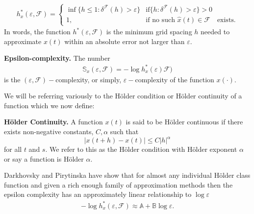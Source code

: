   \begin{align*}
    h_x^*(\varepsilon, \mathcal{F}) = \begin{cases}
      \inf \{ h \leq 1 : \delta^{\mathcal{F}}(h) > \varepsilon \} & \text{if} 
      \{ h : \delta^{\mathcal{F}}(h) > \varepsilon \} > 0  \\ 
        1, &  \text{if no such } \hat x(t) \in \mathcal{F} \hspace{1em}\text{exists.}
    \end{cases}
  \end{align*}
  In words, the function $h^*(\varepsilon, \mathcal{F})$ is the minimum grid spacing $h$ needed to approximate $x(t)$ within an absolute error not larger than $\varepsilon$. 
  \begin{defn}{\textbf{Epsilon-complexity.} }\label{def:ecomplexity}
  The number
  \begin{align}
    \mathbb{S}_x(\varepsilon, \mathcal{F}) =  
    -\log h_x^*(\varepsilon) 
    \mathcal{F})
  \end{align}
  is the $(\varepsilon, \mathcal{F})-$complexity, 
  or simply, $\varepsilon-$complexity of the function $x(\cdot)$. 
  \end{defn}

  We will be referring variously to the H\"older condition or 
  H\"older continuity of a function which we now define:
  \begin{defn}{\textbf{H\"older Continuity.} }\label{def:holder}
    A function $x(t)$ is said to be H\"older continuous if
  there exists non-negative constants, $C, \alpha$ such that 
  \[
      |x(t+h) - x(t)| \leq C|h|^{\alpha}
  \]
    for all $t$ and $s$.
  We refer to this as the H\"older condition with H\"older 
  exponent $\alpha$ or say a function is H\"older $\alpha$.
  \end{defn}
   Darkhovsky and Pirytinska have show that for almost any
  individual H\"older class function and given a rich 
  enough family of approximation methods  
  then the epsilon complexity has an approximately linear
  relationship to $\log \varepsilon$\cite{darkhovsky2013}
  \begin{align} \label{eq:linear-ecomplex}
      -\log h_x^*(\varepsilon, \mathcal{F}) \approx \mathbb{A} + 
    \mathbb{B}\log \varepsilon.  
  \end{align}
  
